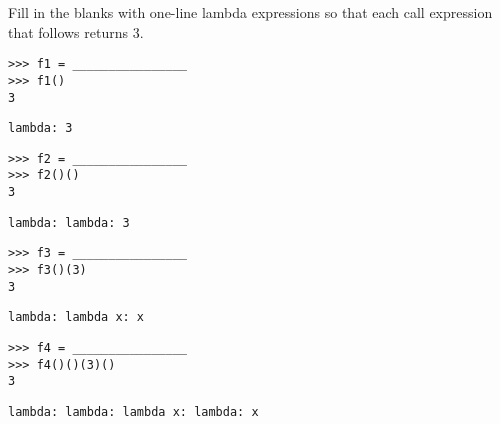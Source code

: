 \question Fill in the blanks with one-line lambda expressions so that each call expression that follows returns 3.

\begin{lstlisting}
>>> f1 = ________________
>>> f1()
3
\end{lstlisting}
\begin{solution}[.125in]
\begin{lstlisting}
lambda: 3
\end{lstlisting}
\end{solution}

\begin{lstlisting}
>>> f2 = ________________
>>> f2()()
3
\end{lstlisting}
\begin{solution}[.125in]
\begin{lstlisting}
lambda: lambda: 3
\end{lstlisting}
\end{solution}

\begin{lstlisting}
>>> f3 = ________________
>>> f3()(3)
3
\end{lstlisting}
\begin{solution}[.125in]
\begin{lstlisting}
lambda: lambda x: x
\end{lstlisting}
\end{solution}

\begin{lstlisting}
>>> f4 = ________________
>>> f4()()(3)()
3
\end{lstlisting}
\begin{solution}[.125in]
\begin{lstlisting}
lambda: lambda: lambda x: lambda: x
\end{lstlisting}
\end{solution}
